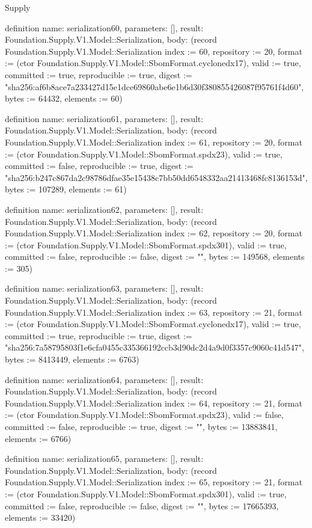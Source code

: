 \begin{lexlean}{Supply}
\begin{semanticmodule}
definition{
  name: serialization60,
  parameters: [],
  result: Foundation.Supply.V1.Model::Serialization,
  body: (record Foundation.Supply.V1.Model::Serialization {index := 60, repository := 20, format := (ctor Foundation.Supply.V1.Model::SbomFormat.cyclonedx17), valid := true, committed := true, reproducible := true, digest := "sha256:af6b8ace7a233427d15e1dce69860abe6e1b6d30f380855426087f95761f4d60", bytes := 64432, elements := 60})
}

definition{
  name: serialization61,
  parameters: [],
  result: Foundation.Supply.V1.Model::Serialization,
  body: (record Foundation.Supply.V1.Model::Serialization {index := 61, repository := 20, format := (ctor Foundation.Supply.V1.Model::SbomFormat.spdx23), valid := true, committed := false, reproducible := true, digest := "sha256:b247c867da2c98786dfae35e15438c7bb50dd6548332aa21413468fc8136153d", bytes := 107289, elements := 61})
}

definition{
  name: serialization62,
  parameters: [],
  result: Foundation.Supply.V1.Model::Serialization,
  body: (record Foundation.Supply.V1.Model::Serialization {index := 62, repository := 20, format := (ctor Foundation.Supply.V1.Model::SbomFormat.spdx301), valid := true, committed := false, reproducible := false, digest := "", bytes := 149568, elements := 305})
}

definition{
  name: serialization63,
  parameters: [],
  result: Foundation.Supply.V1.Model::Serialization,
  body: (record Foundation.Supply.V1.Model::Serialization {index := 63, repository := 21, format := (ctor Foundation.Supply.V1.Model::SbomFormat.cyclonedx17), valid := true, committed := true, reproducible := true, digest := "sha256:7a58795803f1e6cfa0455c335366192ccb3d90dc2d4a9d0f3357c9060c41d547", bytes := 8413449, elements := 6763})
}

definition{
  name: serialization64,
  parameters: [],
  result: Foundation.Supply.V1.Model::Serialization,
  body: (record Foundation.Supply.V1.Model::Serialization {index := 64, repository := 21, format := (ctor Foundation.Supply.V1.Model::SbomFormat.spdx23), valid := false, committed := false, reproducible := true, digest := "", bytes := 13883841, elements := 6766})
}

definition{
  name: serialization65,
  parameters: [],
  result: Foundation.Supply.V1.Model::Serialization,
  body: (record Foundation.Supply.V1.Model::Serialization {index := 65, repository := 21, format := (ctor Foundation.Supply.V1.Model::SbomFormat.spdx301), valid := true, committed := false, reproducible := false, digest := "", bytes := 17665393, elements := 33420})
}


\end{semanticmodule}
\end{lexlean}
